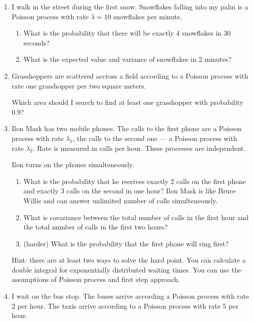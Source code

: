 \documentclass[12pt]{article}
\begin{document}
\begin{enumerate}
  \item I walk in the street during the first snow. Snowflakes falling into my palm 
  is a Poisson process with rate $\lambda = 10$ snowflakes per minute.

  \begin{enumerate}
    \item What is the probability that there will be exactly 4 snowflakes in 30 seconds?
    \item What is the expected value and variance of snowflakes in 2 minutes?
  \end{enumerate}

  \item Grasshoppers are scattered accross a field according to a Poisson process with rate one grasshopper per two square meters. 
  
  Which area should I search to find at least one grasshopper with probability $0.9$?

  \item Ilon Mask has two mobile phones. The calls to the first phone are a Poisson process 
  with rate $\lambda_1$, the calls to the second one — a Poisson process with rate $\lambda_2$. 
  Rate is measured in calls per hour. 
  These processes are independent.

  Ilon turns on the phones simulteneously. 
  
  \begin{enumerate}
    \item What is the probability that he receives exactly 2 calls on the first phone and exactly 
    3 calls on the second in one hour? Ilon Mask is like Bruce Willis and can answer unlimited 
    number of calls simulteneously. 
    \item What is covariance between the total number of calls in the first hour and the total 
    number of calls in the first two hours?
    \item (harder) What is the probability that the first phone will ring first?
  \end{enumerate}
  
  Hint: there are at least two ways to solve the hard point. 
  You can calculate a double integral 
  for exponentially distributed waiting times. 
  You can use the assumptions of Poisson process and first step approach.

  \item I wait on the bus stop. The buses arrive according a Poisson process with rate 2 per hour. 
  The taxis arrive according to a Poisson process with rate 5 per hour.  
  

\end{enumerate}
\end{document}
